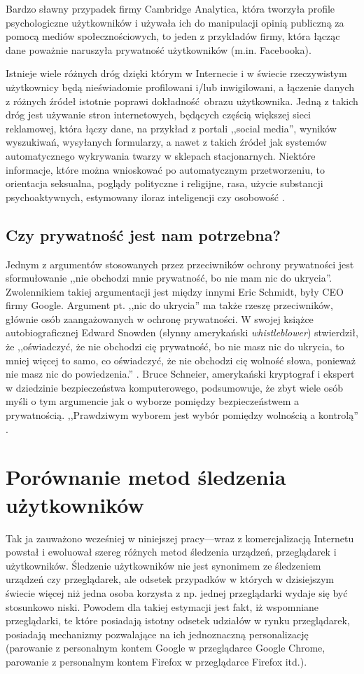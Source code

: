 Bardzo sławny przypadek firmy Cambridge Analytica, która tworzyła profile
psychologiczne użytkowników i używała ich do manipulacji opinią publiczną za
pomocą mediów społecznościowych, to jeden z przykładów firmy, która łącząc dane
poważnie naruszyła prywatność użytkowników (m.in. Facebooka).

Istnieje wiele różnych dróg dzięki którym w Internecie i w świecie rzeczywistym
użytkownicy będą nieświadomie profilowani i/lub inwigilowani, a łączenie danych
z różnych źródeł istotnie poprawi dokładność obrazu użytkownika. Jedną z takich
dróg jest używanie stron internetowych, będących częścią większej sieci
reklamowej, która łączy dane, na przykład z portali ,,social media'', wyników
wyszukiwań, wysyłanych formularzy, a nawet z takich źródeł jak systemów
automatycznego wykrywania twarzy w sklepach stacjonarnych. Niektóre informacje,
które można wnioskować po automatycznym przetworzeniu, to orientacja seksualna,
poglądy polityczne i religijne, rasa, użycie substancji psychoaktywnych,
estymowany iloraz inteligencji czy osobowość \cite{kosinski2013private}.

\subsection{Czy prywatność jest nam potrzebna?}
Jednym z argumentów stosowanych przez przeciwników ochrony prywatności jest
sformułowanie ,,nie obchodzi mnie prywatność, bo nie mam nic do ukrycia''.
Zwolennikiem takiej argumentacji jest między innymi Eric Schmidt, były CEO firmy
Google. Argument pt. ,,nic do ukrycia'' ma także rzeszę przeciwników, głównie
osób zaangażowanych w ochronę prywatności. W swojej książce autobiograficznej
Edward Snowden (słynny amerykański \emph{whistleblower}) stwierdził, że
,,oświadczyć, że nie obchodzi cię prywatność, bo nie masz nic do ukrycia, to
mniej więcej to samo, co oświadczyć, że nie obchodzi cię wolność słowa, ponieważ
nie masz nic do powiedzenia.'' \cite{snowden2019pamiec}. Bruce Schneier,
amerykański kryptograf i ekspert w dziedzinie bezpieczeństwa komputerowego,
podsumowuje, że zbyt wiele osób myśli o tym argumencie jak o wyborze pomiędzy
bezpieczeństwem a prywatnością. ,,Prawdziwym wyborem jest wybór pomiędzy
wolnością a kontrolą'' \cite{schneier2006eternal}.

\section{Porównanie metod śledzenia użytkowników}
Tak ja zauważono wcześniej w niniejszej pracy---wraz z komercjalizacją Internetu
powstał i ewoluował szereg różnych metod śledzenia urządzeń, przeglądarek i
użytkowników. Śledzenie użytkowników nie jest synonimem ze śledzeniem urządzeń
czy przeglądarek, ale odsetek przypadków w których w dzisiejszym świecie więcej
niż jedna osoba korzysta z np. jednej przeglądarki wydaje się być stosunkowo
niski. Powodem dla takiej estymacji jest fakt, iż wspomniane przeglądarki, te
które posiadają istotny odsetek udziałów w rynku przeglądarek, posiadają
mechanizmy pozwalające na ich jednoznaczną personalizację (parowanie z
personalnym kontem Google w przeglądarce Google Chrome, parowanie z personalnym
kontem Firefox w przeglądarce Firefox itd.).

